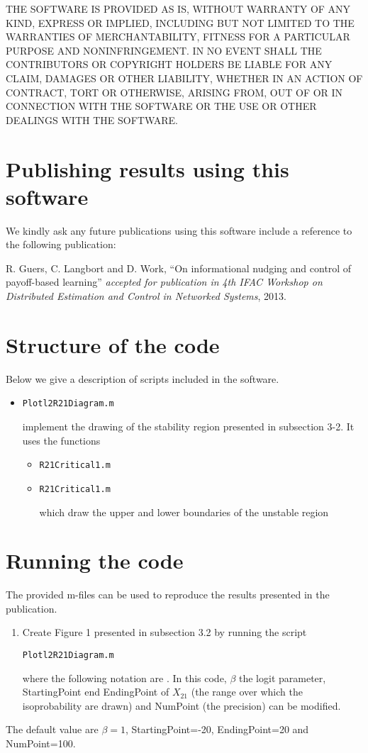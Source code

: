 \documentclass[english]{article}
\begin{document}
THE SOFTWARE IS PROVIDED \textquotedbl{}AS IS\textquotedbl{}, WITHOUT
WARRANTY OF ANY KIND, EXPRESS OR IMPLIED, INCLUDING BUT NOT LIMITED
TO THE WARRANTIES OF MERCHANTABILITY, FITNESS FOR A PARTICULAR PURPOSE
AND NONINFRINGEMENT. IN NO EVENT SHALL THE CONTRIBUTORS OR COPYRIGHT
HOLDERS BE LIABLE FOR ANY CLAIM, DAMAGES OR OTHER LIABILITY, WHETHER
IN AN ACTION OF CONTRACT, TORT OR OTHERWISE, ARISING FROM, OUT OF
OR IN CONNECTION WITH THE SOFTWARE OR THE USE OR OTHER DEALINGS WITH
THE SOFTWARE.


\section{Publishing results using this software}

We kindly ask any future publications using this software include
a reference to the following publication:

R. Guers, C. Langbort and D. Work, ``On informational nudging and control of payoff-based learning'' \emph{accepted
for publication in} \emph{4th IFAC Workshop on Distributed Estimation and Control in Networked Systems}, 2013.

\section{Structure of the code}
Below we give a description of scripts included in the software.
\begin{itemize}
\item \begin{verbatim}Plotl2R21Diagram.m\end{verbatim}
implement the drawing of the stability region presented in subsection 3-2. It uses the functions
\begin{itemize}
\item \begin{verbatim}R21Critical1.m\end{verbatim} \item \begin{verbatim}R21Critical1.m\end{verbatim}
which draw the upper and lower boundaries of the unstable region
\end{itemize}



\end{itemize}
\section{Running the code}
The provided m-files can be used to reproduce the results presented in the publication.
\begin{enumerate}
\item Create Figure 1 presented in subsection 3.2 by running the script\begin{verbatim}Plotl2R21Diagram.m\end{verbatim} where the following notation are .
In this code, $\beta$ the logit parameter, StartingPoint end EndingPoint of $X_{21}$ (the range over which the isoprobability are drawn) and NumPoint (the precision) can be modified.
\end{enumerate}
The default value are $\beta=1$, StartingPoint=-20, EndingPoint=20 and NumPoint=100.
\end{document}
